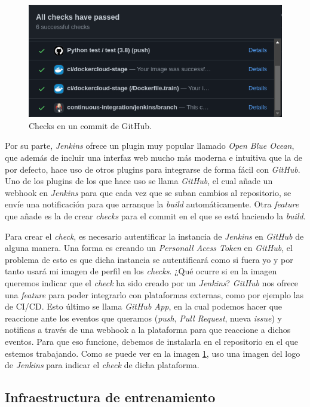 \begin{figure}[H]
	\includegraphics[width=.7\linewidth]{imagenes/05_Implementacion/ghchecks.png}
	\centering
	\caption{Checks en un commit de GitHub.}
	\label{fig:ghchecks}
\end{figure}

Por su parte, \textit{Jenkins} ofrece un plugin muy popular llamado \textit{Open Blue Ocean}, que además de incluir una interfaz web mucho más moderna e intuitiva que la de por defecto, hace uso de otros plugins para integrarse de forma fácil con \textit{GitHub}. Uno de los plugins de los que hace uso se llama \textit{GitHub}, el cual añade un webhook en \textit{Jenkins} para que cada vez que se suban cambios al repositorio, se envíe una notificación para que arranque la \textit{build} automáticamente. Otra \textit{feature} que añade es la de crear \textit{checks} para el commit en el que se está haciendo la \textit{build}.\newline

Para crear el \textit{check}, es necesario autentificar la instancia de \textit{Jenkins} en \textit{GitHub} de alguna manera. Una forma es creando un \textit{Personall Acess Token} en \textit{GitHub}, el problema de esto es que dicha instancia se autentificará como si fuera yo y por tanto usará mi imagen de perfil en los \textit{checks}. ¿Qué ocurre si en la imagen queremos indicar que el \textit{check} ha sido creado por un \textit{Jenkins}? \textit{GitHub} nos ofrece una \textit{feature} para poder integrarlo con plataformas externas, como por ejemplo las de CI/CD. Esto último se llama \textit{GitHub App}, en la cual podemos hacer que reaccione ante los eventos que queramos (\textit{push}, \textit{Pull Request}, nueva \textit{issue}) y notificas a través de una webhook a la plataforma para que reaccione a dichos eventos. Para que eso funcione, debemos de instalarla en el repositorio en el que estemos trabajando. Como se puede ver en la imagen \ref{fig:ghchecks}, uso una imagen del logo de \textit{Jenkins} para indicar el \textit{check} de dicha plataforma.

\subsection{Infraestructura de entrenamiento}

